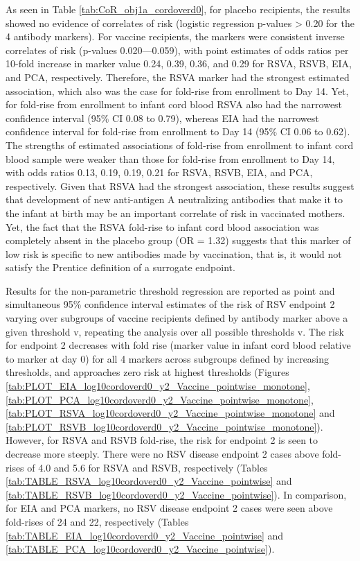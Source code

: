 \documentclass[11pt]{article}
\begin{document}
As seen in Table \ref{tab:CoR_obj1a_cordoverd0}, for placebo recipients, the results showed no evidence of correlates of risk (logistic regression p-values \textgreater{} 0.20 for the 4 antibody markers). For vaccine recipients, the markers were consistent inverse correlates of risk (p-values 0.020---0.059), with point estimates of odds ratios per 10-fold increase in marker value 0.24, 0.39, 0.36, and 0.29 for RSVA, RSVB, EIA, and PCA, respectively. Therefore, the RSVA marker had the strongest estimated association, which also was the case for fold-rise from enrollment to Day 14. Yet, for fold-rise from enrollment to infant cord blood RSVA also had the narrowest confidence interval (95\% CI 0.08 to 0.79), whereas EIA had the narrowest confidence interval for fold-rise from enrollment to Day 14 (95\% CI 0.06 to 0.62). The strengths of estimated associations of fold-rise from enrollment to infant cord blood sample were weaker than those for fold-rise from enrollment to Day 14, with odds ratios 0.13, 0.19, 0.19, 0.21 for RSVA, RSVB, EIA, and PCA, respectively. Given that RSVA had the strongest association, these results suggest that development of new anti-antigen A neutralizing antibodies that make it to the infant at birth may be an important correlate of risk in vaccinated mothers. Yet, the fact that the RSVA fold-rise to infant cord blood association was completely absent in the placebo group (OR = 1.32) suggests that this marker of low risk is specific to new antibodies made by vaccination, that is, it would not satisfy the Prentice definition of a surrogate endpoint.

Results for the non-parametric threshold regression are reported as point and simultaneous 95\% confidence interval estimates of the risk of RSV endpoint 2 varying over subgroups of vaccine recipients defined by antibody marker above a given threshold v, repeating the analysis over all possible thresholds v. The risk for endpoint 2 decreases with fold rise (marker value in infant cord blood relative to marker at day 0) for all 4 markers across subgroups defined by increasing thresholds, and approaches zero risk at highest thresholds (Figures \ref{tab:PLOT_EIA_log10cordoverd0_y2_Vaccine_pointwise_monotone}, \ref{tab:PLOT_PCA_log10cordoverd0_y2_Vaccine_pointwise_monotone}, \ref{tab:PLOT_RSVA_log10cordoverd0_y2_Vaccine_pointwise_monotone} and \ref{tab:PLOT_RSVB_log10cordoverd0_y2_Vaccine_pointwise_monotone}). However, for RSVA and RSVB fold-rise, the risk for endpoint 2 is seen to decrease more steeply. There were no RSV disease endpoint 2 cases above fold-rises of 4.0 and 5.6 for RSVA and RSVB, respectively (Tables \ref{tab:TABLE_RSVA_log10cordoverd0_y2_Vaccine_pointwise} and \ref{tab:TABLE_RSVB_log10cordoverd0_y2_Vaccine_pointwise}). In comparison, for EIA and PCA markers, no RSV disease endpoint 2 cases were seen above fold-rises of 24 and 22, respectively (Tables \ref{tab:TABLE_EIA_log10cordoverd0_y2_Vaccine_pointwise} and \ref{tab:TABLE_PCA_log10cordoverd0_y2_Vaccine_pointwise}).
\end{document}
